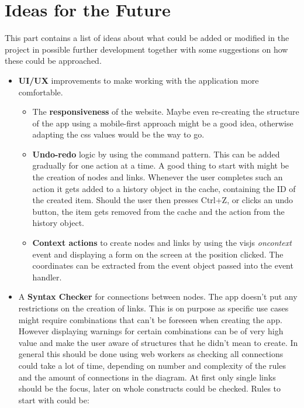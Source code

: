 \chapter{Ideas for the Future}
\label{chap:Future}
This part contains a list of ideas about what could be added or modified in the project in possible further development together with some suggestions on how these could be approached.
\begin{itemize}
\item \textbf{UI/UX} improvements to make working with the application more comfortable.

\begin{itemize}
\item The \textbf{responsiveness} of the website. Maybe even re-creating the structure of the app using a mobile-first approach might be a good idea, otherwise adapting the css values would be the way to go.

\item \textbf{Undo-redo} logic by using the command pattern. This can be added gradually for one action at a time. A good thing to start with might be the creation of nodes and links. Whenever the user completes such an action it gets added to a history object in the cache, containing the ID of the created item. Should the user then presses Ctrl+Z, or clicks an undo button, the item gets removed from the cache and the action from the history object.

\item \textbf{Context actions} to create nodes and links by using the visjs \emph{oncontext} event and displaying a form on the screen at the position clicked. The coordinates can be extracted from the event object passed into the event handler.
\end{itemize}

\item A \textbf{Syntax Checker} for connections between nodes. The app doesn't put any restrictions on the creation of links. This is on purpose as specific use cases might require combinations that can't be foreseen when creating the app. However displaying warnings for certain combinations can be of very high value and make the user aware of structures that he didn't mean to create. In general this should be done using web workers as checking all connections could take a lot of time, depending on number and complexity of the rules and the amount of connections in the diagram. At first only single links should be the focus, later on whole constructs could be checked. Rules to start with could be:


\end{itemize}
